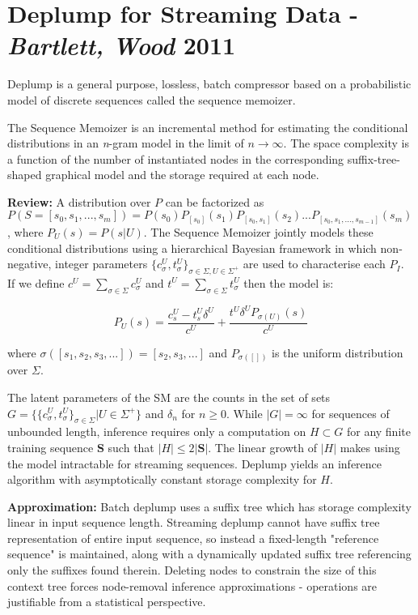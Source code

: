 \section{Deplump for Streaming Data - \textit{Bartlett, Wood} 2011} \cite{bartlett2011deplump}

Deplump is a general purpose, lossless, batch compressor based on a probabilistic model of discrete sequences called the sequence memoizer.

The Sequence Memoizer is an incremental method for estimating the conditional distributions in an \textit{n}-gram model in the limit of $n\to\infty$. The space complexity is a function of the number of instantiated nodes in the corresponding suffix-tree-shaped graphical model and the storage required at each node.

\textbf{Review:} A distribution over $P$ can be factorized as $P(S=[s_{0}, s_{1}, ..., s_{m}])=P(s_{0})P_{[s_{0}]}(s_{1})P_{[s_{0}, s_{1}]}(s_{2})...P_{[s_{0}, s_{1}, ..., s_{m-1}]}(s_{m})$, where $P_{U}(s)=P(s|U)$. The Sequence Memoizer jointly models these conditional distributions using a hierarchical Bayesian framework in which non-negative, integer parameters $\{c_{\sigma}^{U}, t_{\sigma}^{U}\}_{\sigma \in \Sigma, U \in \Sigma^{+}}$ are used to characterise each $P_{I}$. If we define $c^{U}=\sum_{\sigma\in\Sigma}c_{\sigma}^{U}$ and $t^{U}=\sum_{\sigma\in\Sigma}t_{\sigma}^{U}$ then the model is:

\begin{equation}
P_{U}(s)=\frac{c_{s}^{U}-t_{s}^{U}\delta^{U}}{c^{U}}+\frac{t^{U}\delta^{U}P_{\sigma(U)}(s)}{c^{U}}
\label{eq:deplumpReview}
\end{equation}

\noindent where $\sigma([s_{1}, s_{2}, s_{3}, ...])=[s_{2}, s_{3}, ...]$ and $P_{\sigma([])}$ is the uniform distribution over $\Sigma$.

The latent parameters of the SM are the counts in the set of sets $G=\{\{c_{\sigma}^{U}, t_{\sigma}^{U}\}_{\sigma\in\Sigma}|U\in\Sigma^{+}\}$ and $\delta_{n}$ for $n\geq 0$. While $|G|=\infty$ for sequences of unbounded length, inference requires only a computation on $H\subset G$ for any finite training sequence $\boldsymbol S$ such that $|H|\leq 2|\boldsymbol S |$. The linear growth of $|H|$ makes using the model intractable for streaming sequences. Deplump yields an inference algorithm with asymptotically constant storage complexity for $H$.

\textbf{Approximation:} Batch deplump uses a suffix tree which has storage complexity linear in input sequence length. Streaming deplump cannot have suffix tree representation of entire input sequence, so instead a fixed-length "reference sequence" is maintained, along with a dynamically updated suffix tree referencing only the suffixes found therein. Deleting nodes to constrain the size of this context tree forces node-removal inference approximations - operations are justifiable from a statistical perspective.

